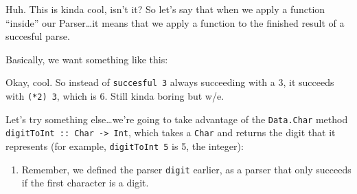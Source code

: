 \documentclass[]{article}
\newenvironment{Shaded}{}{}
\newcommand{\KeywordTok}[1]{\textcolor[rgb]{0.00,0.44,0.13}{\textbf{{#1}}}}
\newcommand{\DataTypeTok}[1]{\textcolor[rgb]{0.56,0.13,0.00}{{#1}}}
\newcommand{\DecValTok}[1]{\textcolor[rgb]{0.25,0.63,0.44}{{#1}}}
\newcommand{\StringTok}[1]{\textcolor[rgb]{0.25,0.44,0.63}{{#1}}}
\newcommand{\CommentTok}[1]{\textcolor[rgb]{0.38,0.63,0.69}{\textit{{#1}}}}
\newcommand{\OtherTok}[1]{\textcolor[rgb]{0.00,0.44,0.13}{{#1}}}
\newcommand{\FunctionTok}[1]{\textcolor[rgb]{0.02,0.16,0.49}{{#1}}}
\newcommand{\NormalTok}[1]{{#1}}
\begin{document}
Huh. This is kinda cool, isn't it? So let's say that when we apply a
function ``inside'' our Parser\ldots{}it means that we apply a function
to the finished result of a succesful parse.

Basically, we want something like this:

\begin{Shaded}
\end{Shaded}

Okay, cool. So instead of \texttt{succesful\ 3} always succeeding with a
3, it succeeds with \texttt{(*2)\ 3}, which is 6. Still kinda boring but
w/e.

Let's try something else\ldots{}we're going to take advantage of the
\texttt{Data.Char} method
\texttt{digitToInt\ ::\ Char\ -\textgreater{}\ Int}, which takes a
\texttt{Char} and returns the digit that it represents (for example,
\texttt{digitToInt\ \textquotesingle{}5\textquotesingle{}} is 5, the
integer):

\begin{Shaded}
\end{Shaded}

\begin{enumerate}
\def\labelenumi{\arabic{enumi}.}
\tightlist
\item
  Remember, we defined the parser \texttt{digit} earlier, as a parser
  that only succeeds if the first character is a digit.
\end{enumerate}
\end{document}
